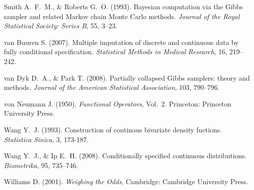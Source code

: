 \documentclass[12pt,a4paper]{article}
\begin{document}
\begin{thebibliography}{40}
Smith A.~F.~M., \& Roberts G.~O. (1993).
Bayesian computation via the Gibbs sampler and related Markov chain Monte Carlo methods.
\emph{Journal of the Royal Statistical Society: Series B}, 55, 3--23.

van Buuren S. (2007).
Multiple imputation of discrete and continuous data by fully conditional specification.
\emph{Statistical Methods in Medical Research}, 16, 219--242.

van Dyk D.~A., \& Park T. (2008).
Partially collapsed Gibbs samplers: theory and methods.
\emph{Journal of the American Statistical Association}, 103, 790--796.

von Neumann J. (1950).
\emph{Functional Operators}, Vol.~2.
Princeton: Princeton University Press.

Wang Y.~J. (1993).
Construction of continous bivariate density fuctions.
\emph{Statistica Sinica}, 3, 173-187.

Wang Y.~J., \& Ip E.~H. (2008).
Conditionally specified continuous distributions.
\emph{Biometrika}, 95, 735--746.

Williams D. (2001).
\emph{Weighing the Odds}, Cambridge: Cambridge University Press.
\end{thebibliography}
\end{document}

